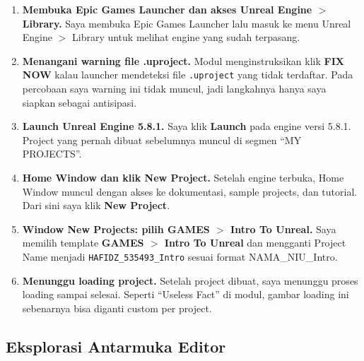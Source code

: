\documentclass[a4paper,oneside,12pt]{report}
\begin{document}
\begin{enumerate}
    \item \textbf{Membuka Epic Games Launcher dan akses Unreal Engine $>$ Library.} Saya membuka Epic Games Launcher lalu masuk ke menu Unreal Engine $>$ Library untuk melihat engine yang sudah terpasang.

    \item \textbf{Menangani warning file .uproject.} Modul menginstruksikan klik \textbf{FIX NOW} kalau launcher mendeteksi file \texttt{.uproject} yang tidak terdaftar. Pada percobaan saya warning ini tidak muncul, jadi langkahnya hanya saya siapkan sebagai antisipasi.

    \item \textbf{Launch Unreal Engine 5.8.1.} Saya klik \textbf{Launch} pada engine versi 5.8.1. Project yang pernah dibuat sebelumnya muncul di segmen ``MY PROJECTS''.

    \item \textbf{Home Window dan klik New Project.} Setelah engine terbuka, Home Window muncul dengan akses ke dokumentasi, sample projects, dan tutorial. Dari sini saya klik \textbf{New Project}.

    \item \textbf{Window New Projects: pilih GAMES $>$ Intro To Unreal.} Saya memilih template \textbf{GAMES $>$ Intro To Unreal} dan mengganti Project Name menjadi \texttt{HAFIDZ\_535493\_Intro} sesuai format NAMA\_NIU\_Intro.

    \item \textbf{Menunggu loading project.} Setelah project dibuat, saya menunggu proses loading sampai selesai. Seperti ``Useless Fact'' di modul, gambar loading ini sebenarnya bisa diganti custom per project.
\end{enumerate}

\subsection{Eksplorasi Antarmuka Editor}
\end{document}
